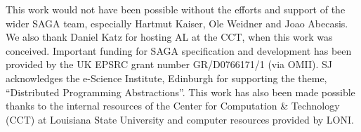\documentclass[times, 10pt,twocolumn]{article}
\begin{document}
This work would not have been possible without the efforts and support
of the wider SAGA team, especially Hartmut Kaiser, Ole Weidner and
Joao Abecasis. We also thank Daniel Katz for hosting AL at the CCT,
when this work was conceived.  Important funding for SAGA
specification and development has been provided by the UK EPSRC grant
number GR/D0766171/1 (via OMII).  SJ acknowledges the e-Science
Institute, Edinburgh for supporting the theme, ``Distributed
Programming Abstractions''.  This work has also been made possible
thanks to the internal resources of the Center for Computation \&
Technology (CCT) at Louisiana State University and computer resources
provided by LONI.  

\end{document}
